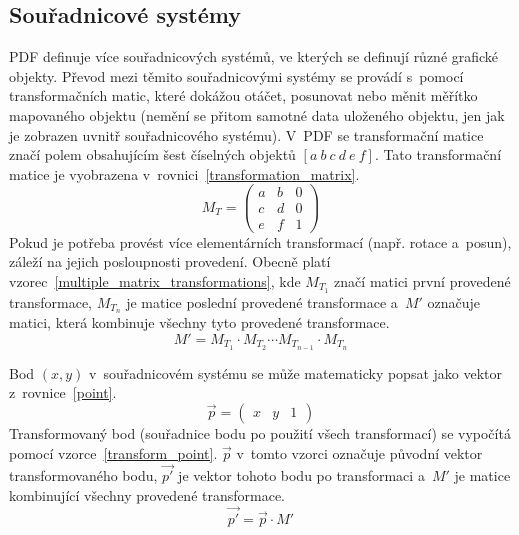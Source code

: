 \subsection*{Souřadnicové systémy}
PDF definuje více souřadnicových systémů, ve kterých se definují různé grafické
objekty. Převod mezi těmito souřadnicovými systémy se provádí s~pomocí
transformačních matic, které dokážou otáčet, posunovat nebo měnit měřítko
mapovaného objektu (nemění se přitom samotné data uloženého objektu, jen jak je
zobrazen uvnitř souřadnicového systému). V~PDF se transformační matice značí polem
obsahujícím šest číselných objektů $[a~b~c~d~e~f]$. Tato transformační matice je
vyobrazena v~rovnici~\eqref{transformation_matrix}.
\begin{equation}\label{transformation_matrix}
    M_T = 
    \begin{pmatrix}
        a & b & 0 \\
        c & d & 0 \\
        e & f & 1
    \end{pmatrix}
\end{equation}
Pokud je potřeba provést více elementárních transformací 
(např. rotace a~posun), záleží na jejich posloupnosti provedení. Obecně
platí vzorec~\eqref{multiple_matrix_transformations}, kde $M_{T_1}$ značí matici
první provedené transformace, $M_{T_n}$ je matice poslední provedené transformace
a~$M'$ označuje matici, která kombinuje všechny tyto provedené transformace.
\begin{equation} \label{multiple_matrix_transformations}
    M' = M_{T_1} \cdot M_{T_2} \cdots M_{T_{n-1}} \cdot M_{T_n}
\end{equation}

Bod $(x, y)$ v~souřadnicovém systému se může matematicky popsat jako vektor
z~rovnice~\eqref{point}.
\begin{equation}\label{point}
    \overrightarrow{p}  = 
    \begin{pmatrix}
        x & y & 1
    \end{pmatrix}
\end{equation}
Transformovaný bod (souřadnice bodu po použití všech transformací) se vypočítá
pomocí vzorce~\eqref{transform_point}. $\overrightarrow{p}$ v~tomto vzorci označuje původní vektor
transformovaného bodu, $\overrightarrow{p'}$ je vektor tohoto bodu po transformaci a~$M'$ je matice
kombinující všechny provedené transformace.
\begin{equation} \label{transform_point}
    \overrightarrow{p'} = \overrightarrow{p} \cdot M'
\end{equation}

